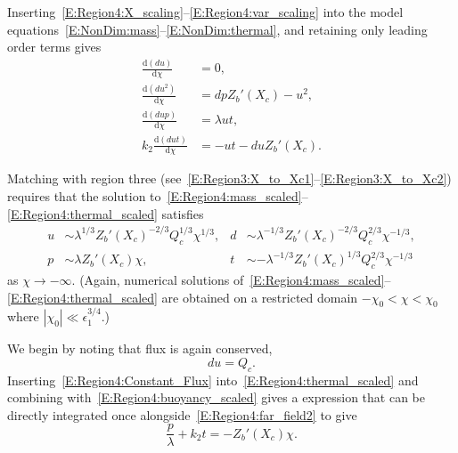 \documentclass{jfm}
\newcommand{\dd}[2]{\frac{\mathrm{d} #1}{\mathrm{d} #2}}
\newcommand{\epsone}{\epsilon_{1}} %
\renewcommand{\p}{p} %
\renewcommand{\t}{t} %
\begin{document}
Inserting~\eqref{E:Region4:X_scaling}--\eqref{E:Region4:var_scaling} into the model equations~\eqref{E:NonDim:mass}--\eqref{E:NonDim:thermal}, and retaining only leading order terms gives
\begin{align}
\dd{(du)}{\chi} &=0,\label{E:Region4:mass_scaled}\\
\dd{(du^2)}{\chi} &=  d \p Z_b'(X_c) -u^2,\label{E:Region4:mom_scaled}\\
\dd{(du\p)}{\chi} &=\lambda  u\t,\label{E:Region4:buoyancy_scaled}\\
k_2 \dd{(du \t)}{\chi} &=- u \t - du Z_b'(X_c).\label{E:Region4:thermal_scaled}
\end{align}

Matching with region three (see~\eqref{E:Region3:X_to_Xc1}--\eqref{E:Region3:X_to_Xc2}) requires that the solution to~\eqref{E:Region4:mass_scaled}--\eqref{E:Region4:thermal_scaled} satisfies
\begin{align}
u &\sim \lambda^{1/3}Z_b'(X_c)^{-2/3}Q_c^{1/3} \chi^{1/3}, &  d &\sim \lambda^{-1/3} Z_b'(X_c)^{-2/3} Q_c^{2/3}\chi^{-1/3}\label{E:Region4:far_field1},\\
\p &\sim  \lambda Z_b'(X_c) \chi, & \t &\sim -\lambda^{-1/3} Z_b'(X_c)^{1/3} Q_c^{2/3}\chi^{-1/3}\label{E:Region4:far_field2}
\end{align}
as $\chi \to -\infty$. (Again, numerical solutions of~\eqref{E:Region4:mass_scaled}--\eqref{E:Region4:thermal_scaled} are obtained on a restricted domain $-\chi_0 < \chi < \chi_0$ where $|\chi_0| \ll \epsone^{3/4}$.)

We begin by noting that flux is again conserved,
\begin{equation}\label{E:Region4:Constant_Flux}
du  = Q_c.
\end{equation}
Inserting~\eqref{E:Region4:Constant_Flux} into~\eqref{E:Region4:thermal_scaled} and combining with~\eqref{E:Region4:buoyancy_scaled} gives a expression that can be directly integrated once alongside~\eqref{E:Region4:far_field2} to give
\begin{equation}\label{E:Region4:Linear_p_t}
\frac{\p}{\lambda} + k_2 \t = -Z_b'(X_c)\chi.
\end{equation}
\end{document}
